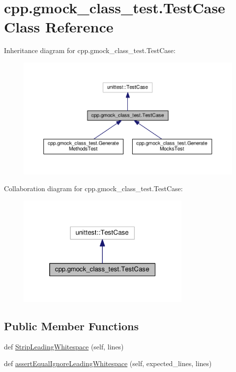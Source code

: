 \hypertarget{classcpp_1_1gmock__class__test_1_1TestCase}{}\section{cpp.\+gmock\+\_\+class\+\_\+test.\+Test\+Case Class Reference}
\label{classcpp_1_1gmock__class__test_1_1TestCase}


Inheritance diagram for cpp.\+gmock\+\_\+class\+\_\+test.\+Test\+Case\+:
\nopagebreak
\begin{figure}[H]
\begin{center}
\leavevmode
\includegraphics[width=350pt]{classcpp_1_1gmock__class__test_1_1TestCase__inherit__graph}
\end{center}
\end{figure}


Collaboration diagram for cpp.\+gmock\+\_\+class\+\_\+test.\+Test\+Case\+:
\nopagebreak
\begin{figure}[H]
\begin{center}
\leavevmode
\includegraphics[width=241pt]{classcpp_1_1gmock__class__test_1_1TestCase__coll__graph}
\end{center}
\end{figure}
\subsection*{Public Member Functions}
\begin{DoxyCompactItemize}
\item 
def \hyperlink{classcpp_1_1gmock__class__test_1_1TestCase_a366b15717eebc41e397357868c5734c5}{Strip\+Leading\+Whitespace} (self, lines)
\item 
def \hyperlink{classcpp_1_1gmock__class__test_1_1TestCase_a68f88bba11511f8c582123d47bf80464}{assert\+Equal\+Ignore\+Leading\+Whitespace} (self, expected\+\_\+lines, lines)
\end{DoxyCompactItemize}


